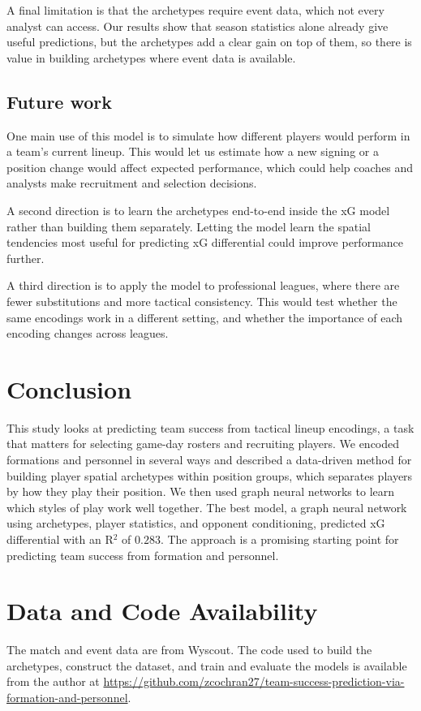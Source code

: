 \documentclass[11pt,twocolumn]{article}
\begin{document}
A final limitation is that the archetypes require event data, which not
every analyst can access. Our results show that season statistics alone
already give useful predictions, but the archetypes add a clear gain on
top of them, so there is value in building archetypes where event data is
available.

\subsection{Future work}

One main use of this model is to simulate how different players would
perform in a team's current lineup. This would let us estimate how a new
signing or a position change would affect expected performance, which
could help coaches and analysts make recruitment and selection decisions.

A second direction is to learn the archetypes end-to-end inside the xG
model rather than building them separately. Letting the model learn the
spatial tendencies most useful for predicting xG differential could
improve performance further.

A third direction is to apply the model to professional leagues, where
there are fewer substitutions and more tactical consistency. This would
test whether the same encodings work in a different setting, and whether
the importance of each encoding changes across leagues.

\section{Conclusion}

This study looks at predicting team success from tactical lineup
encodings, a task that matters for selecting game-day rosters and
recruiting players. We encoded formations and personnel in several ways
and described a data-driven method for building player spatial archetypes
within position groups, which separates players by how they play their
position. We then used graph neural networks to learn which styles of play
work well together. The best model, a graph neural network using
archetypes, player statistics, and opponent conditioning, predicted xG
differential with an R$^2$ of $0.283$. The approach is a promising
starting point for predicting team success from formation and personnel.

\section*{Data and Code Availability}
The match and event data are from Wyscout. The
code used to build the archetypes, construct the dataset, and train and
evaluate the models is available from the author at
\url{https://github.com/zcochran27/team-success-prediction-via-formation-and-personnel}.
\end{document}
